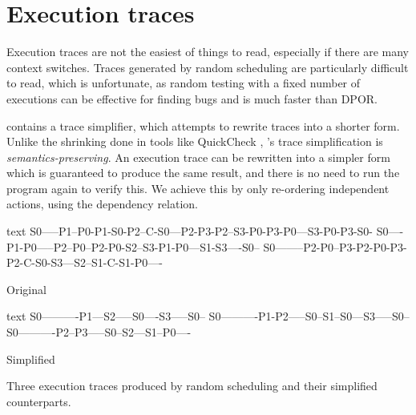 \section{Execution traces}
\label{sec:dejafu-traces}

Execution traces are not the easiest of things to read, especially if
there are many context switches.  Traces generated by random
scheduling are particularly difficult to read, which is unfortunate,
as random testing with a fixed number of executions can be effective
for finding bugs and is much faster than DPOR.

\dejafu{} contains a trace simplifier, which attempts to rewrite
traces into a shorter form.  Unlike the shrinking done in tools like
QuickCheck \parencite{claessen2000}, \dejafu{}'s trace simplification is
\emph{semantics-preserving}.  An execution trace can be rewritten into
a simpler form which is guaranteed to produce the same result, and
there is no need to run the program again to verify this.  We achieve
this by only re-ordering independent actions, using the dependency
relation.

\begin{listing}
\begin{sublisting}{\textwidth}
\centering
\begin{cminted}{text}
S0-----P1--P0-P1-S0-P2--C-S0---P2-P3-P2--S3-P0-P3-P0---S3-P0-P3-S0-
S0----P1-P0-----P2--P0--P2-P0-S2--S3-P1-P0---S1-S3----S0--
S0--------P2-P0--P3-P2-P0-P3-P2-C-S0-S3---S2--S1-C-S1-P0----
\end{cminted}
\caption{Original}\label{lst:trace_simplification_orig}
\end{sublisting}

\vspace{1.5em}

\begin{sublisting}{\textwidth}
\centering
\begin{cminted}{text}
S0----------P1---S2-----S0----S3-----S0--
S0----------P1-P2-----S0--S1--S0---S3-----S0--
S0----------P2--P3-----S0--S2---S1--P0----
\end{cminted}
\caption{Simplified}\label{lst:trace_simplification_simplified}
\end{sublisting}
\caption[The effect of trace simplification.]{Three execution traces produced by random scheduling and their simplified counterparts.}\label{lst:trace_simplification}
\end{listing}

